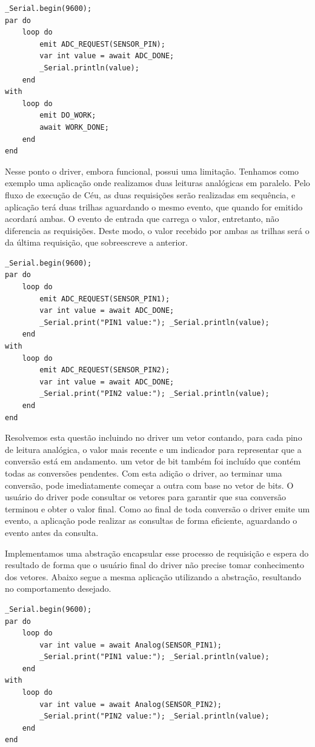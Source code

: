 \documentclass[11pt]{article}
\begin{document}
\begin{lstlisting}[style=CStyle,label=analogceu,caption=Aplicação utilizando driver em Céu]
_Serial.begin(9600);
par do
    loop do
        emit ADC_REQUEST(SENSOR_PIN);
        var int value = await ADC_DONE;
        _Serial.println(value);
    end
with
    loop do
        emit DO_WORK;
        await WORK_DONE;
    end
end
\end{lstlisting}
\par Nesse ponto o driver, embora funcional, possui uma limitação. Tenhamos como exemplo uma aplicação onde realizamos duas leituras analógicas em paralelo. Pelo fluxo de execução de Céu, as duas requisições serão realizadas em sequência, e aplicação terá duas trilhas aguardando o mesmo evento, que quando for emitido acordará ambas. O evento de entrada que carrega o valor, entretanto, não diferencia as requisições. Deste modo, o valor recebido por ambas as trilhas será o da última requisição, que sobreescreve a anterior.
\begin{lstlisting}[style=CStyle,label=analogceutwo1,caption=Duas leituras analógicas concorrentes não suportadas]
_Serial.begin(9600);
par do
    loop do
        emit ADC_REQUEST(SENSOR_PIN1);
        var int value = await ADC_DONE;
        _Serial.print("PIN1 value:"); _Serial.println(value);
    end
with
    loop do
        emit ADC_REQUEST(SENSOR_PIN2);
        var int value = await ADC_DONE;
        _Serial.print("PIN2 value:"); _Serial.println(value);
    end
end
\end{lstlisting}
\par Resolvemos esta questão incluindo no driver um vetor contando, para cada pino de leitura analógica, o valor mais recente e um indicador para representar que a conversão está em andamento. um vetor de bit também foi incluído que contém todas as conversões pendentes. Com esta adição o driver, ao terminar uma conversão, pode imediatamente começar a outra com base no vetor de bits. O usuário do driver pode consultar os vetores para garantir que sua conversão terminou e obter o valor final. Como ao final de toda conversão o driver emite um evento, a aplicação pode realizar as consultas de forma eficiente, aguardando o evento antes da consulta. 
\par Implementamos uma abstração encapsular esse processo de requisição e espera do resultado de forma que o usuário final do driver não precise tomar conhecimento dos vetores. Abaixo segue a mesma aplicação utilizando a abstração, resultando no comportamento desejado.
\begin{lstlisting}[style=CStyle,label=analogceutwo2,caption=Duas leituras analógicas concorrentes utilizando a abstração]
_Serial.begin(9600);
par do
    loop do
        var int value = await Analog(SENSOR_PIN1);
        _Serial.print("PIN1 value:"); _Serial.println(value);
    end
with
    loop do
        var int value = await Analog(SENSOR_PIN2);
        _Serial.print("PIN2 value:"); _Serial.println(value);
    end
end
\end{lstlisting}
\end{document}
